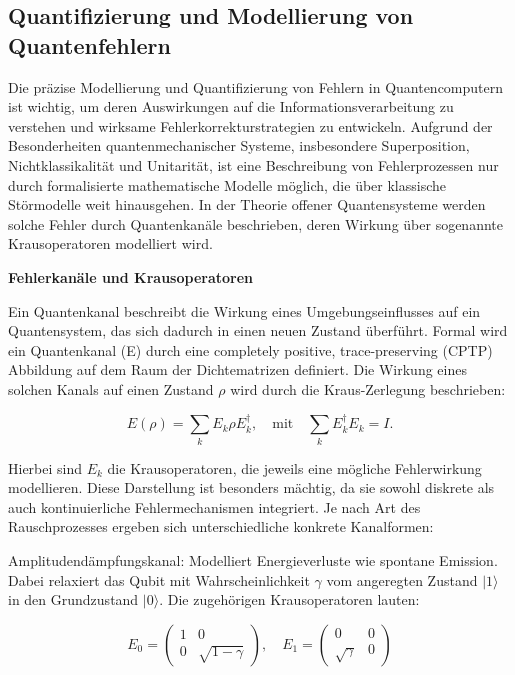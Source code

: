 \subsection{Quantifizierung und Modellierung von Quantenfehlern}
Die präzise Modellierung und Quantifizierung von Fehlern in Quantencomputern ist wichtig, um deren Auswirkungen auf die Informationsverarbeitung zu verstehen und wirksame Fehlerkorrekturstrategien zu entwickeln. Aufgrund der Besonderheiten quantenmechanischer Systeme, insbesondere Superposition, Nichtklassikalität und Unitarität, ist eine Beschreibung von Fehlerprozessen nur durch formalisierte mathematische Modelle möglich, die über klassische Störmodelle weit hinausgehen. In der Theorie offener Quantensysteme werden solche Fehler durch Quantenkanäle beschrieben, deren Wirkung über sogenannte Krausoperatoren modelliert wird.\medskip



\textbf{Fehlerkanäle und Krausoperatoren}

Ein Quantenkanal beschreibt die Wirkung eines Umgebungseinflusses auf ein Quantensystem, das sich dadurch in einen neuen Zustand überführt. Formal wird ein Quantenkanal (E) durch eine completely positive, trace-preserving (CPTP) Abbildung auf dem Raum der Dichtematrizen definiert. Die Wirkung eines solchen Kanals auf einen Zustand $\rho$ wird durch die Kraus-Zerlegung beschrieben:

$$
E(\rho) = \sum_k E_k \rho E_k^\dagger, \quad \text{mit} \quad \sum_k E_k^\dagger E_k = I.
$$

Hierbei sind  $E_k$ die Krausoperatoren, die jeweils eine mögliche Fehlerwirkung modellieren. Diese Darstellung ist besonders mächtig, da sie sowohl diskrete als auch kontinuierliche Fehlermechanismen integriert. Je nach Art des Rauschprozesses ergeben sich unterschiedliche konkrete Kanalformen:\medskip

Amplitudendämpfungskanal: Modelliert Energieverluste wie spontane Emission. Dabei relaxiert das Qubit mit Wahrscheinlichkeit 
$\gamma$ vom angeregten Zustand $|1\rangle$ in den Grundzustand $|0\rangle$. Die zugehörigen Krausoperatoren lauten:


$$
E_0 = \begin{pmatrix} 1 & 0 \\ 0 & \sqrt{1-\gamma} \end{pmatrix}, \quad E_1 = \begin{pmatrix} 0 & 0 \\ \sqrt{\gamma} & 0 \end{pmatrix}
$$


